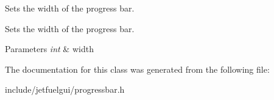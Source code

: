 Sets the width of the progress bar. 

Sets the width of the progress bar.


\begin{DoxyParams}{Parameters}
{\em int} & width \\
\hline
\end{DoxyParams}


The documentation for this class was generated from the following file\+:\begin{DoxyCompactItemize}
\item 
include/jetfuelgui/progressbar.\+h\end{DoxyCompactItemize}
